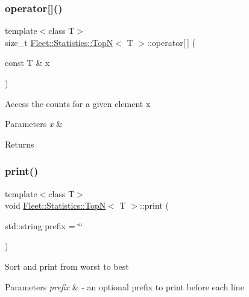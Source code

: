 \subsubsection{\texorpdfstring{operator[]()}{operator[]()}}
{\footnotesize\ttfamily template$<$class T$>$ \\
size\+\_\+t \hyperlink{class_fleet_1_1_statistics_1_1_top_n}{Fleet\+::\+Statistics\+::\+TopN}$<$ T $>$\+::operator\mbox{[}$\,$\mbox{]} (\begin{DoxyParamCaption}\item[{const T \&}]{x }\end{DoxyParamCaption})\hspace{0.3cm}{\ttfamily [inline]}}

Access the counts for a given element x 
\begin{DoxyParams}{Parameters}
{\em x} & \\
\hline
\end{DoxyParams}
\begin{DoxyReturn}{Returns}

\end{DoxyReturn}
\mbox{\label{class_fleet_1_1_statistics_1_1_top_n_ae37eb4f39eb12d32a1f04aa30276da86}} 
\subsubsection{\texorpdfstring{print()}{print()}}
{\footnotesize\ttfamily template$<$class T$>$ \\
void \hyperlink{class_fleet_1_1_statistics_1_1_top_n}{Fleet\+::\+Statistics\+::\+TopN}$<$ T $>$\+::print (\begin{DoxyParamCaption}\item[{std\+::string}]{prefix = {\ttfamily \char`\"{}\char`\"{}} }\end{DoxyParamCaption})\hspace{0.3cm}{\ttfamily [inline]}}

Sort and print from worst to best 
\begin{DoxyParams}{Parameters}
{\em prefix} & -\/ an optional prefix to print before each line\\
\hline
\end{DoxyParams}
\mbox{\label{class_fleet_1_1_statistics_1_1_top_n_a762c937fe5dcab09d87d2414201b6b1e}} 
